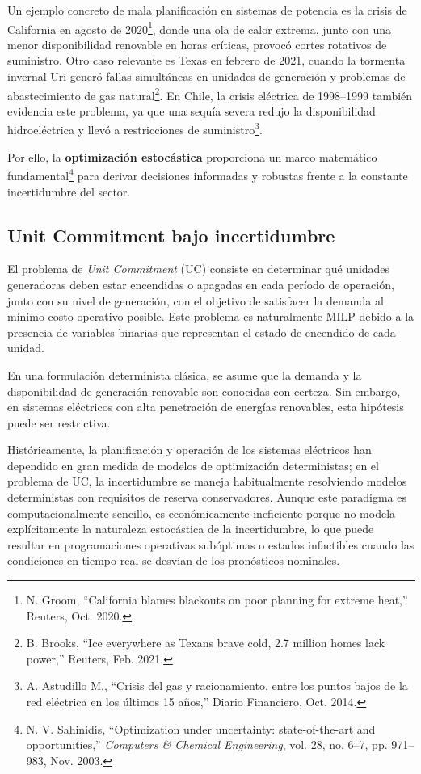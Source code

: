 \documentclass[
	spanish, %
	letterpaper, oneside
]{article}
\begin{document}
Un ejemplo concreto de mala planificación en sistemas de potencia es la crisis de California en agosto de 2020\footnote{N. Groom, ``California blames blackouts on poor planning for extreme heat,'' Reuters, Oct. 2020.}, donde una ola de calor extrema, junto con una menor disponibilidad renovable en horas críticas, provocó cortes rotativos de suministro. Otro caso relevante es Texas en febrero de 2021, cuando la tormenta invernal Uri generó fallas simultáneas en unidades de generación y problemas de abastecimiento de gas natural\footnote{B. Brooks, ``Ice everywhere as Texans brave cold, 2.7 million homes lack power,'' Reuters, Feb. 2021.}. En Chile, la crisis eléctrica de 1998–1999 también evidencia este problema, ya que una sequía severa redujo la disponibilidad hidroeléctrica y llevó a restricciones de suministro\footnote{A. Astudillo M., ``Crisis del gas y racionamiento, entre los puntos bajos de la red eléctrica en los últimos 15 años,'' Diario Financiero, Oct. 2014.}.

Por ello, la \textbf{optimización estocástica} proporciona un marco matemático fundamental\footnote{N. V. Sahinidis, ``Optimization under uncertainty: state-of-the-art and opportunities,'' \textit{Computers \& Chemical Engineering}, vol. 28, no. 6–7, pp. 971–983, Nov. 2003.} para derivar decisiones informadas y robustas frente a la constante incertidumbre del sector.

\subsection{Unit Commitment bajo incertidumbre}

El problema de \textit{Unit Commitment} (UC) consiste en determinar qué unidades generadoras deben estar encendidas o apagadas en cada período de operación, junto con su nivel de generación, con el objetivo de satisfacer la demanda al mínimo costo operativo posible. Este problema es naturalmente MILP debido a la presencia de variables binarias que representan el estado de encendido de cada unidad.

En una formulación determinista clásica, se asume que la demanda y la disponibilidad de generación renovable son conocidas con certeza. Sin embargo, en sistemas eléctricos con alta penetración de energías renovables, esta hipótesis puede ser restrictiva. 

Históricamente, la planificación y operación de los sistemas eléctricos han dependido en gran medida de modelos de optimización deterministas; en el problema de UC, la incertidumbre se maneja habitualmente resolviendo modelos deterministas con requisitos de reserva conservadores. Aunque este paradigma es computacionalmente sencillo, es económicamente ineficiente porque no modela explícitamente la naturaleza estocástica de la incertidumbre, lo que puede resultar en programaciones operativas subóptimas o estados infactibles cuando las condiciones en tiempo real se desvían de los pronósticos nominales.
\end{document}
